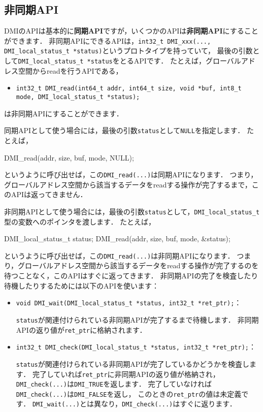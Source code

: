 \documentclass[report,12pt]{jsbook}
\begin{document}
\subsection{非同期API}

DMIのAPIは基本的に\textbf{同期API}ですが，いくつかのAPIは\textbf{非同期API}にすることができます．
非同期APIにできるAPIは，\texttt{int32\_t DMI\_xxx(..., DMI\_local\_status\_t *status)}というプロトタイプを持っていて，
最後の引数として\texttt{DMI\_local\_status\_t *status}をとるAPIです．
たとえば，グローバルアドレス空間からreadを行うAPIである，
\begin{itemize}
\item \texttt{int32\_t DMI\_read(int64\_t addr, int64\_t size, void *buf, int8\_t mode, DMI\_local\_status\_t *status);}
\end{itemize}
は非同期APIにすることができます．

同期APIとして使う場合には，最後の引数\texttt{status}として\texttt{NULL}を指定します．
たとえば，
\begin{code}
DMI_read(addr, size, buf, mode, NULL);
\end{code}
というように呼び出せば，この\texttt{DMI\_read(...)}は同期APIになります．
つまり，グローバルアドレス空間から該当するデータをreadする操作が完了するまで，このAPIは返ってきません．

非同期APIとして使う場合には，最後の引数\texttt{status}として，\texttt{DMI\_local\_status\_t}型の変数へのポインタを渡します．
たとえば，
\begin{code}
DMI\_local\_status\_t status;
DMI_read(addr, size, buf, mode, &status);
\end{code}
というように呼び出せば，この\texttt{DMI\_read(...)}は非同期APIになります．
つまり，グローバルアドレス空間から該当するデータをreadする操作が完了するのを待つことなく，このAPIはすぐに返ってきます．
非同期APIの完了を検査したり待機したりするためには以下のAPIを使います：

\begin{itemize}
\item \texttt{void DMI\_wait(DMI\_local\_status\_t *status, int32\_t *ret\_ptr);}：
  
  \texttt{status}が関連付けられている非同期APIが完了するまで待機します．
  非同期APIの返り値が\texttt{ret\_ptr}に格納されます．
\item \texttt{int32\_t DMI\_check(DMI\_local\_status\_t *status, int32\_t *ret\_ptr);}：
  
  \texttt{status}が関連付けられている非同期APIが完了しているかどうかを検査します．
  完了していれば\texttt{ret\_ptr}に非同期APIの返り値が格納され，
  \texttt{DMI\_check(...)}は\texttt{DMI\_TRUE}を返します．
  完了していなければ\texttt{DMI\_check(...)}は\texttt{DMI\_FALSE}を返し，
  このときの\texttt{ret\_ptr}の値は未定義です．
  \texttt{DMI\_wait(...)}とは異なり，\texttt{DMI\_check(...)}はすぐに返ります．
\end{itemize}
\end{document}
